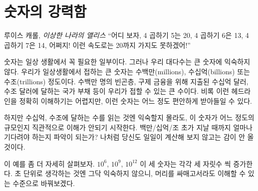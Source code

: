 \chapter{숫자의 강력함}
\label{les:15}

\begin{chapquote}{루이스 캐롤, \textit{이상한 나라의 앨리스}}
	\enquote{어디 보자, 
		4 곱하기 5는 20, 
		4 곱하기 6은 13, 
		4 곱하기 7은 14, 
		어쩌지! 이런 속도로는 20까지 가지도 못하겠어!}
\end{chapquote}

\begin{comment}
	Numbers are an essential part of our everyday life. Large numbers,
	however, aren't something most of us are too familiar with. The largest
	numbers we might encounter in everyday life are in the range of
	millions, billions, or trillions. We might read about millions of people
	in poverty, billions of dollars spent on bank bailouts, and trillions of
	national debt. Even though it's hard to make sense of these headlines,
	we are somewhat comfortable with the size of those numbers.
\end{comment}
숫자는 일상 생활에서 꼭 필요한 일부이다. 
그러나 우리 대다수는 큰 숫자에 익숙하지 않다. 
우리가 일상생활에서 접하는 큰 숫자는 수백만(millions), 수십억(billions) 또는 수조(trillions) 정도이다.
수백만 명의 빈곤층, 구제 금융을 위해 지출된 수십억 달러, 수조 달러에 달하는 국가 부채 등이 우리가 접할 수 있는 큰 수이다.
비록 이런 헤드라인을 정확히 이해하기는 어렵지만, 이런 숫자는 어느 정도 편안하게 받아들일 수 있다.

\begin{comment}
	Although we might seem comfortable with billions and trillions, our
	intuition already starts to fail with numbers of this magnitude. Do you
	have an intuition how long you would have to wait for a
	million/billion/trillion seconds to pass? If you are anything like me,
	you are lost without actually crunching the numbers.
\end{comment}
하지만 수십억, 수조에 달하는 수를 읽는 것엔 익숙할지 몰라도, 이 숫자가 어느 정도의 규모인지 직관적으로 이해가 안되기 시작한다.
백만/십억/조 초가 지날 때까지 얼마나 기다려야 하는지 파악이 되는가?
나처럼 당신도 일일이 계산해 보지 않고는 감이 안 올 것이다. 

\begin{comment}
	Let's take a closer look at this example: the difference between each is an
	increase by three orders of magnitude: $10^6$, $10^9$, $10^{12}$. Thinking about
	seconds is not very useful, so let's translate this into something we can wrap
	our head around:
\end{comment}
이 예를 좀 더 자세히 살펴보자. $10^6$, $10^9$, $10^{12}$ 이 세 숫자는 각각 세 자릿수 씩 증가한다.  
초 단위로 생각하는 것엔 그닥 익숙하지 않으니, 머리를 싸매고서라도 이해할 수 있는 수준으로 바꿔보겠다.

